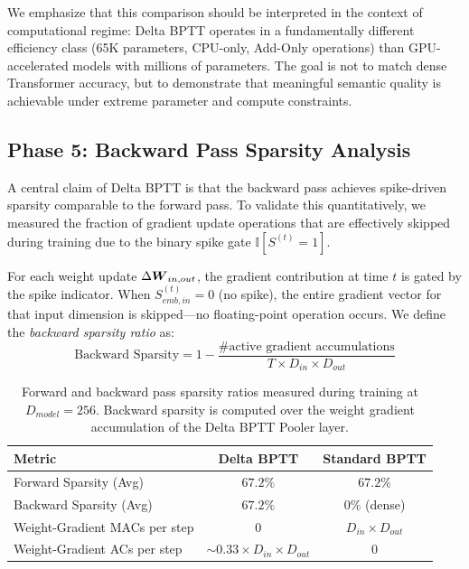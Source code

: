 \documentclass[10pt]{article} %
\begin{document}
We emphasize that this comparison should be interpreted in the context of computational regime: Delta BPTT operates in a fundamentally different efficiency class (65K parameters, CPU-only, Add-Only operations) than GPU-accelerated models with millions of parameters. The goal is not to match dense Transformer accuracy, but to demonstrate that meaningful semantic quality is achievable under extreme parameter and compute constraints.

\subsection{Phase 5: Backward Pass Sparsity Analysis}
A central claim of Delta BPTT is that the backward pass achieves spike-driven sparsity comparable to the forward pass. To validate this quantitatively, we measured the fraction of gradient update operations that are effectively skipped during training due to the binary spike gate $\mathbb{I}[S^{(t)} = 1]$.

For each weight update $\Delta \boldsymbol{W}_{in, out}$, the gradient contribution at time $t$ is gated by the spike indicator. When $S_{emb,in}^{(t)} = 0$ (no spike), the entire gradient vector for that input dimension is skipped---no floating-point operation occurs. We define the \textit{backward sparsity ratio} as:
\begin{equation}
\text{Backward Sparsity} = 1 - \frac{\text{\# active gradient accumulations}}{T \times D_{in} \times D_{out}}
\end{equation}

\begin{table}[t!]
\caption{Forward and backward pass sparsity ratios measured during training at $D_{model} = 256$. Backward sparsity is computed over the weight gradient accumulation of the Delta BPTT Pooler layer.}
\label{tab:sparsity}
\begin{center}
\begin{tabular}{lcc}
\toprule
\textbf{Metric} & \textbf{Delta BPTT} & \textbf{Standard BPTT} \\
\midrule
Forward Sparsity (Avg) & $67.2\%$ & $67.2\%$ \\
Backward Sparsity (Avg) & $67.2\%$ & $0\%$ (dense) \\
Weight-Gradient MACs per step & $0$ & $D_{in} \times D_{out}$ \\
Weight-Gradient ACs per step & $\sim 0.33 \times D_{in} \times D_{out}$ & $0$ \\
\bottomrule
\end{tabular}
\end{center}
\end{table}
\end{document}
